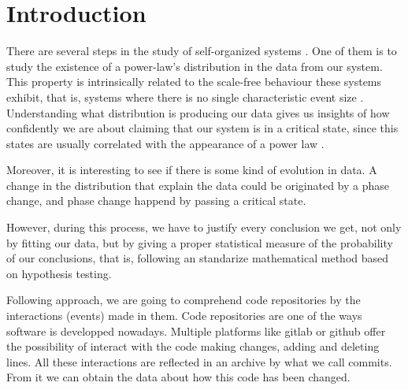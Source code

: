 \documentclass[conference]{IEEEtran}
\begin{document}


\section{Introduction}\label{introduction}

There are several steps in the study of self-organized systems  \cite{bak1988self}. One of
them is to study the existence of a power-law's distribution in the data
from our system. This property is intrinsically related to the scale-free behaviour
these systems exhibit, that is, systems where there is no single characteristic event size \cite{golyk20self}.
Understanding what distribution is producing our data gives us insights of
how confidently we are about claiming that our system is in a critical state, since this states
are usually correlated with the appearance of a power law \cite{newman2005power}. %

Moreover, it is interesting to see if there is some kind of evolution in data. 
A change in the distribution that explain the data could be originated by a 
phase change, and phase change happend by passing a critical state. 

However, during this process, we have to justify every conclusion we get, not only 
by fitting our data, but by giving a proper statistical measure of the probability 
of our conclusions, that is, following an standarize mathematical method based on
hypothesis testing.%


Following \cite{merelo2017self} approach, we are going to comprehend code repositories
by the interactions (events) made in them. Code repositories are one of the ways 
software is developped nowadays. Multiple platforms like gitlab or github 
offer the possibility of interact with the code making changes, adding and deleting 
lines. 
All these interactions are reflected in an archive by what we call commits. From it
we can obtain the data about how this code has been changed. 
\end{document}

